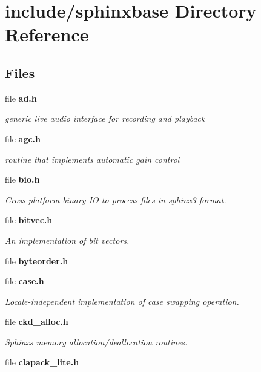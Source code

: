 \section{include/sphinxbase Directory Reference}
\label{dir_e3d154c296a8e9be2797a4f81e9375b2}
\subsection*{Files}
\begin{DoxyCompactItemize}
\item 
file {\bf ad.\+h}
\begin{DoxyCompactList}\small\item\em generic live audio interface for recording and playback \end{DoxyCompactList}\item 
file {\bf agc.\+h}
\begin{DoxyCompactList}\small\item\em routine that implements automatic gain control \end{DoxyCompactList}\item 
file {\bf bio.\+h}
\begin{DoxyCompactList}\small\item\em Cross platform binary I\+O to process files in sphinx3 format. \end{DoxyCompactList}\item 
file {\bf bitvec.\+h}
\begin{DoxyCompactList}\small\item\em An implementation of bit vectors. \end{DoxyCompactList}\item 
file {\bfseries byteorder.\+h}
\item 
file {\bf case.\+h}
\begin{DoxyCompactList}\small\item\em Locale-\/independent implementation of case swapping operation. \end{DoxyCompactList}\item 
file {\bf ckd\+\_\+alloc.\+h}
\begin{DoxyCompactList}\small\item\em Sphinx\textquotesingle{}s memory allocation/deallocation routines. \end{DoxyCompactList}\item 
file {\bfseries clapack\+\_\+lite.\+h}
\item 

\end{DoxyCompactItemize}
